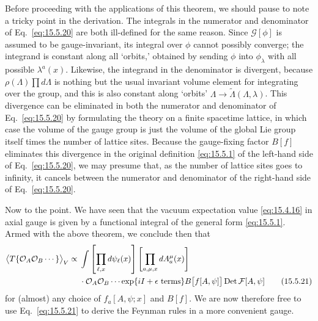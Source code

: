 Before proceeding with the applications of this theorem, we should pause to
note a tricky point in the derivation. The integrals in the numerator and
denominator of Eq.~\eqref{eq:15.5.20} are both ill-defined for the same reason.
Since $\mathcal G[\phi]$ is assumed to be gauge-invariant, its integral over
$\phi$ cannot possibly converge; the integrand is constant along all `orbits,'
obtained by sending $\phi$ into $\phi_\lambda$ with all possible
$\lambda^a(x)$. Likewise, the integrand in the denominator is divergent,
because $\rho(\Lambda)\prod d\Lambda$ is nothing but the usual invariant
volume element for integrating over the group, and this is also constant along
`orbits' $\Lambda\longrightarrow\widetilde\Lambda(\Lambda,\lambda)$. This
divergence can be eliminated in both the numerator and denominator of
Eq.~\eqref{eq:15.5.20} by formulating the theory on a finite spacetime lattice,
in which case the volume of the gauge group is just the volume of the global
Lie group itself times the number of lattice sites. Because the gauge-fixing
factor $B[f]$ eliminates this divergence in the original definition
\eqref{eq:15.5.1} of the left-hand side of Eq.~\eqref{eq:15.5.20}, we may
presume that, as the number of lattice sites goes to infinity, it cancels
between the numerator and denominator of the right-hand side of
Eq.~\eqref{eq:15.5.20}.

Now to the point. We have seen that the vacuum expectation value
\eqref{eq:15.4.16} in axial gauge is given by a functional integral of the
general form \eqref{eq:15.5.1}. Armed with the above theorem, we conclude then
that
\begin{align}
  \bigl\langle T\{\mathcal O_A\mathcal O_B\cdots\}\bigr\rangle_V
  \propto{}&\int\left[\prod_{\ell,x}d\psi_\ell(x)\right]
  \left[\prod_{a,\mu,x}dA_a^\mu(x)\right]
  \notag\\
  &\cdot\mathcal O_A\mathcal O_B\cdots\exp\{iI+\epsilon\text{ terms}\}
  B\bigl[f[A,\psi]\bigr]\operatorname{Det}\mathcal F[A,\psi]
  \tag{15.5.21}\label{eq:15.5.21}
\end{align}
for (almost) any choice of $f_a[A,\psi;x]$ and $B[f]$. We are now
therefore free to use Eq.~\eqref{eq:15.5.21} to derive the Feynman rules in a
more convenient gauge.

